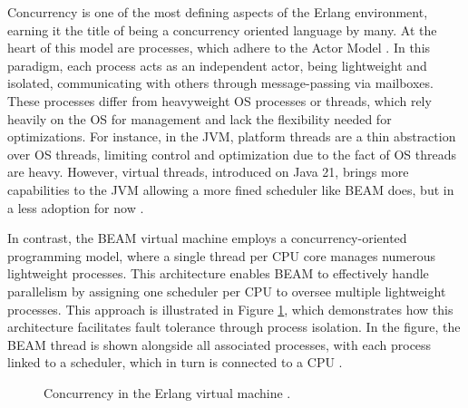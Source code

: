 Concurrency is one of the most defining aspects of the Erlang environment, earning it the title of being a concurrency oriented language by many. At the heart of this model are processes, which adhere to the Actor Model \cite{Juric2024,Valkov2018}. In this paradigm, each process acts as an independent actor, being lightweight and isolated, communicating with others through message-passing via mailboxes. These processes differ from heavyweight \gls{OS} processes or threads, which rely heavily on the \gls{OS} for management and lack the flexibility needed for optimizations. For instance, in the \gls{JVM}, platform threads are a thin abstraction over \gls{OS} threads, limiting control and optimization due to the fact of \gls{OS} threads are heavy. However, virtual threads, introduced on Java 21, brings more capabilities to the \gls{JVM} allowing a more fined scheduler like BEAM does, but in a less adoption for now \cite{erlang-concurrency-blog}.

In contrast, the \gls{BEAM} virtual machine employs a concurrency-oriented programming model, where a single thread per \gls{CPU} core manages numerous lightweight processes. This architecture enables \gls{BEAM} to effectively handle parallelism by assigning one scheduler per \gls{CPU} to oversee multiple lightweight processes. This approach is illustrated in Figure \ref{fig:beam-process}, which demonstrates how this architecture facilitates fault tolerance through process isolation. In the figure, the \gls{BEAM} thread is shown alongside all associated processes, with each process linked to a scheduler, which in turn is connected to a \gls{CPU} \cite{Juric2024}.


\begin{figure}
    \centering
    \caption[Concurrency in the Erlang virtual machine]{Concurrency in the Erlang virtual machine \cite{Juric2024}.}
    \label{fig:beam-process}
\end{figure}

